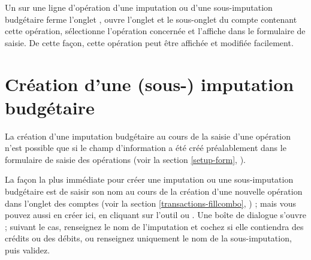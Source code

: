 Un  sur une ligne d'opération d'une imputation ou d'une sous-imputation budgétaire ferme l'onglet , ouvre l'onglet  et le sous-onglet du compte contenant cette opération, sélectionne l'opération concernée et l'affiche dans le formulaire de saisie. De cette façon, cette opération peut être affichée et modifiée facilement.


\section{Création d'une (sous-) imputation budgétaire\label{budgetarylines-new}}


La création d'une imputation budgétaire au cours de la saisie d'une opération n'est possible que si le champ d'information a été créé préalablement dans le formulaire de saisie des opérations (voir la section \vref{setup-form}, ).

\ifIllustration
\label{budgetarylines-new-img}
\fi

\noindent La façon la plus immédiate pour créer une imputation ou une sous-imputation budgétaire est de saisir son nom au cours de la création d'une nouvelle opération dans l'onglet des comptes (voir la section \vref{transactions-fillcombo}, ) ; mais vous pouvez aussi en créer ici, en cliquant sur l'outil  ou . Une boîte de dialogue s'ouvre ; suivant le cas, renseignez le nom de l'imputation et cochez si elle contiendra des crédits ou des débits, ou renseignez uniquement le nom de la sous-imputation, puis validez.

